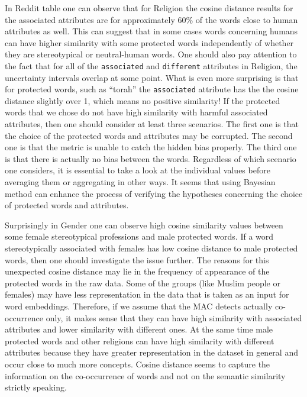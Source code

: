 \documentclass[
  12pt,
]{book}
\begin{document}
In Reddit table one can observe that for Religion the cosine distance results for the associated attributes are for approximately 60\% of the words close to human attributes as well. This can suggest that in some cases words concerning humans can have higher similarity with some protected words independently of whether they are stereotypical or neutral-human words. One should also pay attention to the fact that for all of the \texttt{associated} and \texttt{different} attributes in Religion, the uncertainty intervals overlap at some point. What is even more surprising is that for protected words, such as ``torah'' the \texttt{associated} attribute has the the cosine distance slightly over 1, which means no positive similarity! If the protected words that we chose do not have high similarity with harmful associated attributes, then one should consider at least three scenarios. The first one is that the choice of the protected words and attributes may be corrupted. The second one is that the metric is unable to catch the hidden bias properly. The third one is that there is actually no bias between the words. Regardless of which scenario one considers, it is essential to take a look at the individual values before averaging them or aggregating in other ways. It seems that using Bayesian method can enhance the process of verifying the hypotheses concerning the choice of protected words and attributes.

Surprisingly in Gender one can observe high cosine similarity values between some female stereotypical professions and male protected words. If a word stereotypically associated with females has low cosine distance to male protected words, then one should investigate the issue further. The reasons for this unexpected cosine distance may lie in the frequency of appearance of the protected words in the raw data. Some of the groups (like Muslim people or females) may have less representation in the data that is taken as an input for word embeddings. Therefore, if we assume that the MAC detects actually co-occurrence only, it makes sense that they can have high similarity with associated attributes and lower similarity with different ones. At the same time male protected words and other religions can have high similarity with different attributes because they have greater representation in the dataset in general and occur close to much more concepts. Cosine distance seems to capture the information on the co-occurrence of words and not on the semantic similarity strictly speaking.
\end{document}
